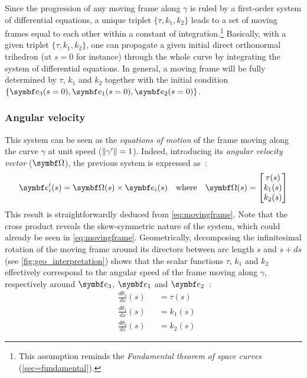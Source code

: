 Since the progression of any moving frame along $\gamma$ is ruled by a first-order system of differential equations, a unique triplet $\{\tau, k_{1}, k_{2}\}$ leads to a set of moving frames equal to each other within a constant of integration.\footnote{This assumption reminds the \emph{Fundamental theorem of space curves} (\cref{sec=fundamental}).} Basically, with a given triplet $\{\tau, k_{1}, k_{2}\}$, one can propagate a given initial direct orthonormal trihedron (at $s=0$ for instance) through the whole curve by integrating the system of differential equations. In general, a moving frame will be fully determined by $\tau$, $k_{1}$ and $k_{2}$ together with the initial condition $\{\vect{e}_{3}(s=0),\vect{e}_{1}(s=0),\vect{e}_{2}(s=0)\}$.


\subsubsection{Angular velocity}
This system can be seen as the \emph{equations of motion} of the frame moving along the curve $\gamma$ at unit speed ($\lVert\gamma'\rVert=1$). Indeed, introducing its \emph{angular velocity vector} ($\vect{\Omega}$), the previous system is expressed as~:
\begin{equation}
	\vect{e}'_{i}(s) = \vect{\Omega}(s) \times \vect{e}_{i}(s)
	\quad \text{where} \quad
	\vect{\Omega}(s)
	=
	\begin{bmatrix}
		\tau(s) \\
		k_1(s) \\
		k_2(s)
	\end{bmatrix}
\end{equation}
This result is straightforwardly deduced from \cref{eq:movingframe}. Note that the cross product reveals the skew-symmetric nature of the system, which could already be seen in \cref{eq:movingframe}.
Geometrically, decomposing the infinitesimal rotation of the moving frame around its directors between arc length $s$ and $s+ds$ (see \cref{fig:geo_interpretation}) shows that the scalar functions $\tau$, $k_{1}$ and $k_{2}$ effectively correspond to the angular speed of the frame moving along $\gamma$, respectively around $\vect{e}_{3}$, $\vect{e}_{1}$ and $\vect{e}_{2}$~:
\begin{subequations}
	\begin{alignat}{2}
		&\frac{d\theta_3}{ds}(s) &&= \tau(s)
		\\[0.5em]
		&\frac{d\theta_1}{ds}(s) &&= k_{1}(s)
		\\[0.5em]
		&\frac{d\theta_2}{ds}(s) &&= k_{2}(s)
	\end{alignat}
\end{subequations}



